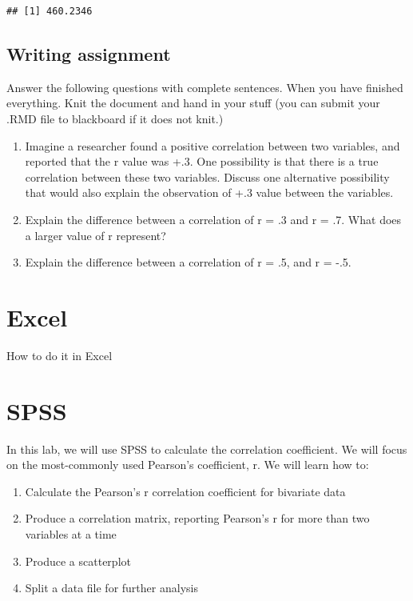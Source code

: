 \documentclass[
]{book}
\providecommand{\tightlist}{%
  \setlength{\itemsep}{0pt}\setlength{\parskip}{0pt}}
\begin{document}
\begin{verbatim}
## [1] 460.2346
\end{verbatim}

\hypertarget{writing-assignment-2}{%
\subsection{Writing assignment}\label{writing-assignment-2}}

Answer the following questions with complete sentences. When you have finished everything. Knit the document and hand in your stuff (you can submit your .RMD file to blackboard if it does not knit.)

\begin{enumerate}
\def\labelenumi{\arabic{enumi}.}
\item
  Imagine a researcher found a positive correlation between two variables, and reported that the r value was +.3. One possibility is that there is a true correlation between these two variables. Discuss one alternative possibility that would also explain the observation of +.3 value between the variables.
\item
  Explain the difference between a correlation of r = .3 and r = .7. What does a larger value of r represent?
\item
  Explain the difference between a correlation of r = .5, and r = -.5.
\end{enumerate}

\hypertarget{excel-3}{%
\section{Excel}\label{excel-3}}

How to do it in Excel

\hypertarget{spss-3}{%
\section{SPSS}\label{spss-3}}

In this lab, we will use SPSS to calculate the correlation coefficient. We will focus on the most-commonly used Pearson's coefficient, r. We will learn how to:

\begin{enumerate}
\def\labelenumi{\arabic{enumi}.}
\tightlist
\item
  Calculate the Pearson's r correlation coefficient for bivariate data
\item
  Produce a correlation matrix, reporting Pearson's r for more than two variables at a time
\item
  Produce a scatterplot
\item
  Split a data file for further analysis
\end{enumerate}
\end{document}
